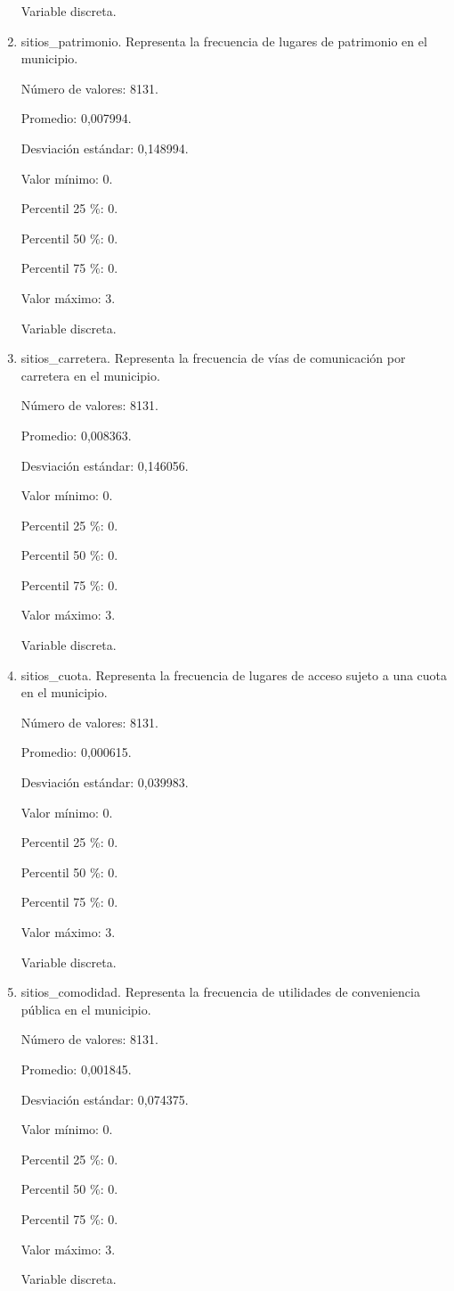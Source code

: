 \begin{enumerate}
	Variable discreta.

	\item sitios\_patrimonio. Representa la frecuencia de lugares de patrimonio en el municipio.
	
	Número de valores: 8131.
	
	Promedio: 0,007994.
	
	Desviación estándar: 0,148994.
	
	Valor mínimo: 0.
	
	Percentil 25 \%: 0.
	
	Percentil 50 \%: 0.
	
	Percentil 75 \%: 0.
	
	Valor máximo: 3.
	
	Variable discreta.

	\item sitios\_carretera. Representa la frecuencia de vías de comunicación por carretera en el municipio.
	
	Número de valores: 8131.
	
	Promedio: 0,008363.
	
	Desviación estándar: 0,146056.
	
	Valor mínimo: 0.
	
	Percentil 25 \%: 0.
	
	Percentil 50 \%: 0.
	
	Percentil 75 \%: 0.
	
	Valor máximo: 3.
	
	Variable discreta.

	\item sitios\_cuota. Representa la frecuencia de lugares de acceso sujeto a una cuota en el municipio.
	
	Número de valores: 8131.
	
	Promedio: 0,000615.
	
	Desviación estándar: 0,039983.
	
	Valor mínimo: 0.
	
	Percentil 25 \%: 0.
	
	Percentil 50 \%: 0.
	
	Percentil 75 \%: 0.
	
	Valor máximo: 3.
	
	Variable discreta.

	\item sitios\_comodidad. Representa la frecuencia de utilidades de conveniencia pública en el municipio.
	
	Número de valores: 8131.
	
	Promedio: 0,001845.
	
	Desviación estándar: 0,074375.
	
	Valor mínimo: 0.
	
	Percentil 25 \%: 0.
	
	Percentil 50 \%: 0.
	
	Percentil 75 \%: 0.
	
	Valor máximo: 3.
	
	Variable discreta.
\end{enumerate}

